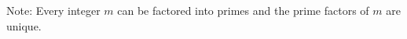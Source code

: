 \documentclass[12pt]{article}
\begin{document}
Note: Every integer $m$ can be factored into primes and the prime factors of $m$ are unique. 











\end{document}
